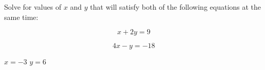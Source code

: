 

Solve for values of $x$ and $y$ that will satisfy both of the following equations at the same time:

$$x + 2y = 9$$

$$4x - y = -18$$







$x = -3$ \hskip 30pt $y = 6$











